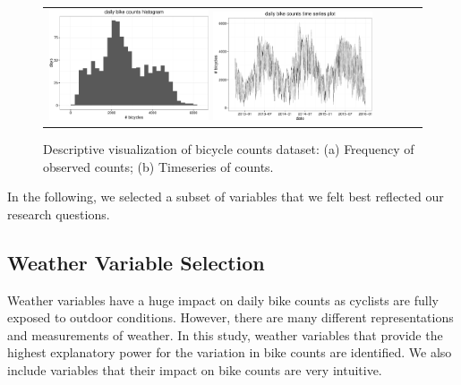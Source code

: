 \documentclass [11pt, proquest] {uwthesis}[2015/03/03]
\begin{document}
\begin{figure}
\begin{tabular}{ll}
\includegraphics[width=0.45\textwidth]{figures/daily_hist}
\includegraphics[width=0.45\textwidth]{figures/daily_tscount_plot}\\
\end{tabular}
\caption{Descriptive visualization of bicycle counts dataset: (a) Frequency of observed counts; (b) Timeseries of counts.}
\label{fig:descriptionbc}
\end{figure}

In the following, we selected a subset of variables that we felt best reflected our research questions. 

\subsection{Weather Variable Selection}
Weather variables have a huge impact on daily bike counts as cyclists are fully exposed to outdoor conditions. However, there are many different representations and measurements of weather. In this study, weather variables that provide the highest explanatory power for the variation in bike counts are identified. We also include variables that their impact on bike counts are very intuitive. 
\end{document}

